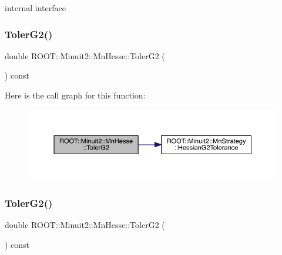 internal interface \mbox{\label{classROOT_1_1Minuit2_1_1MnHesse_ae625b94360c1c974854b63aedbcc6a1a}} 
\subsubsection{\texorpdfstring{TolerG2()}{TolerG2()}\hspace{0.1cm}{\footnotesize\ttfamily [1/3]}}
{\footnotesize\ttfamily double R\+O\+O\+T\+::\+Minuit2\+::\+Mn\+Hesse\+::\+Toler\+G2 (\begin{DoxyParamCaption}{ }\end{DoxyParamCaption}) const\hspace{0.3cm}{\ttfamily [inline]}}

Here is the call graph for this function\+:
\nopagebreak
\begin{figure}[H]
\begin{center}
\leavevmode
\includegraphics[width=350pt]{d1/d02/classROOT_1_1Minuit2_1_1MnHesse_ae625b94360c1c974854b63aedbcc6a1a_cgraph}
\end{center}
\end{figure}
\mbox{\label{classROOT_1_1Minuit2_1_1MnHesse_ae625b94360c1c974854b63aedbcc6a1a}} 
\subsubsection{\texorpdfstring{TolerG2()}{TolerG2()}\hspace{0.1cm}{\footnotesize\ttfamily [2/3]}}
{\footnotesize\ttfamily double R\+O\+O\+T\+::\+Minuit2\+::\+Mn\+Hesse\+::\+Toler\+G2 (\begin{DoxyParamCaption}{ }\end{DoxyParamCaption}) const\hspace{0.3cm}{\ttfamily [inline]}}

